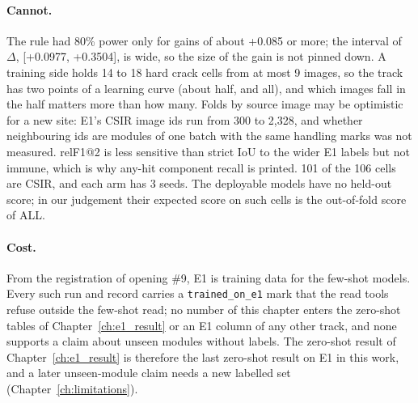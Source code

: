 \paragraph{Cannot.} The rule had 80\% power only for gains of about +0.085 or more; the interval of $\Delta$, [+0.0977, +0.3504],
is wide, so the size of the gain is not pinned down. A training side holds 14 to 18 hard crack cells from at most 9 images, so the track has two points of a learning curve
(about half, and all), and which images fall in the half matters more than how many. Folds by source image may be optimistic for a
new site: E1's CSIR image ids run from 300 to 2,328, and whether neighbouring ids are modules of one batch with the same handling
marks was not measured. relF1@2 is less sensitive than strict IoU to the wider E1 labels but not immune, which is why any-hit
component recall is printed. 101 of the 106 cells are CSIR, and each arm has 3 seeds. The deployable models have no held-out score;
in our judgement their expected score on such cells is the out-of-fold score of ALL.

\paragraph{Cost.} From the registration of opening \#9, E1 is training data for the few-shot models. Every such run and record
carries a \texttt{trained\_on\_e1} mark that the read tools refuse outside the few-shot read; no number of this chapter enters the
zero-shot tables of Chapter~\ref{ch:e1_result} or an E1 column of any other track, and none supports a claim about unseen modules
without labels. The zero-shot result of Chapter~\ref{ch:e1_result} is therefore the last zero-shot result on E1 in this work, and a
later unseen-module claim needs a new labelled set (Chapter~\ref{ch:limitations}).

